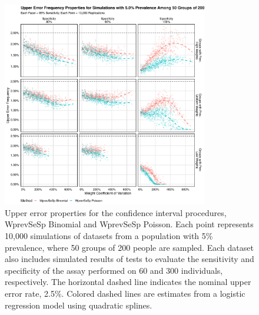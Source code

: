 \begin{figure}
\centering
\includegraphics[width=0.8\textwidth]{imperfect_upper_error_frequency_50_groups_0_05_prev}
\caption{Upper error properties for the confidence interval procedures, WprevSeSp Binomial and WprevSeSp Poisson.
Each point represents 10,000 simulations of datasets from a population with 5\% prevalence, where 50 groups of 200 people are sampled.
Each dataset also includes simulated results of tests to evaluate the sensitivity and specificity of the assay performed on 60 and 300 individuals, respectively.
The horizontal dashed line indicates the nominal upper error rate, 2.5\%.
Colored dashed lines are estimates from a logistic regression model using quadratic splines.}
\label{ch_3:fig:imperfect_upper_error_frequency_50_groups_0_05_prev}
\end{figure}

